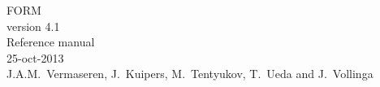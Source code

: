 \documentclass{report}
\begin{document}
\begin{center}
{\Huge FORM \\ \Large version 4.1 \\ \huge Reference manual} \\

{25-oct-2013} \\

{J.A.M.~Vermaseren, J.~Kuipers, M.~Tentyukov, T.~Ueda and J.~Vollinga}
\end{center}

\tableofcontents





















\printindex
\end{document}
